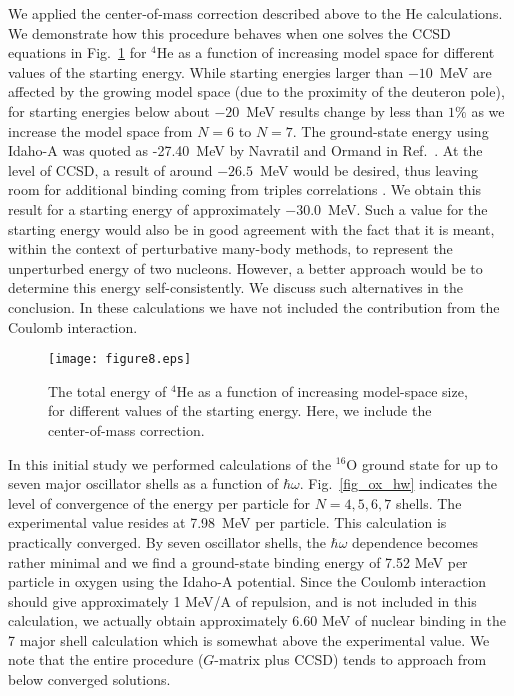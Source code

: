 \documentclass[aps,prc,twocolumn,floatfix]{revtex4}
\begin{document}
We applied the center-of-mass correction described above to the 
He calculations. We demonstrate 
how this procedure behaves when one solves the CCSD equations in
Fig.~\ref{fig_com} for $^{4}$He as a function of increasing 
model space for different values of the starting energy. While 
starting energies larger than $-10$~MeV are affected by the 
growing model space (due to the proximity of the deuteron pole), for
starting energies below about $-20$~MeV results change by less than
$1\%$ as we increase the model space from $N=6$ to $N=7$. 
The ground-state energy using
Idaho-A was quoted as -27.40~MeV by Navratil and Ormand in
Ref.~\cite{petr_erich02}. At the level of CCSD, a result of around $-26.5$~MeV
would be desired, thus leaving room for additional binding coming
from triples correlations \cite{ccsdt03}. We obtain this result for a
starting energy of approximately $-30.0$~MeV. 
Such a value for the 
starting energy would also be in good agreement with the fact that it is
meant, within the context  of perturbative many-body methods, to represent
the unperturbed energy of two nucleons. However, a better approach would be to
determine this energy self-consistently. We discuss such alternatives 
in the conclusion. In these calculations we have not included the contribution
from the Coulomb interaction.  
\begin{figure}
\vspace{0.25in}
\texttt{[image: figure8.eps]}
\caption{The total energy of $^4$He as a function of increasing
model-space size, for different values of the starting energy. 
Here, we include the center-of-mass correction.}
\label{fig_com}
\end{figure}

In this initial study we performed calculations of the $^{16}$O 
ground state for up to seven major oscillator shells as a function
of $\hbar\omega$. Fig.~\ref{fig_ox_hw} indicates the level of convergence
of the energy per particle for $N=4,5,6,7$ shells. The experimental value
resides at 7.98~MeV per particle.  This calculation is practically converged. 
By seven oscillator shells, the $\hbar\omega$ dependence becomes rather
minimal and we find a ground-state binding energy of 7.52 MeV per particle in
oxygen using the Idaho-A potential. Since the Coulomb interaction should give
approximately 1 MeV/A of repulsion, and is not included in this 
calculation, we actually obtain approximately 6.60 MeV of nuclear binding
in the 7 major shell calculation which is somewhat above the experimental
value. We note that the entire procedure ($G$-matrix plus CCSD) tends to 
approach from below converged solutions. 
\end{document}
